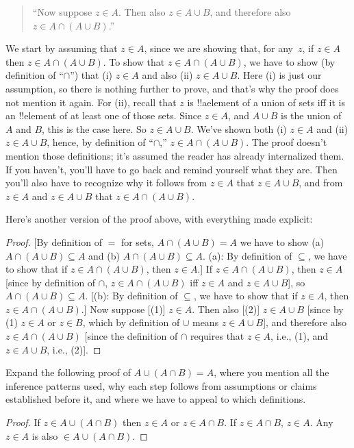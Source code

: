 \documentclass[../../../include/open-logic-section]{subfiles}
\begin{document}
\begin{quote}
``Now suppose $z \in A$. Then also $z \in A \cup B$, and
therefore also $z \in A \cap (A \cup B)$.''
\end{quote}

We start by assuming that $z \in A$, since we are showing that, for
any~$z$, if $z \in A$ then $z \in A \cap (A \cup B)$.  To show that $z
\in A \cap (A \cup B)$, we have to show (by definition of ``$\cap$'')
that (i) $z \in A$ and also (ii) $z \in A \cup B$. Here (i) is just
our assumption, so there is nothing further to prove, and that's why
the proof does not mention it again. For (ii), recall that $z$ is
!!a{element} of a union of sets iff it is an !!{element} of at least
one of those sets. Since $z \in A$, and $A \cup B$ is the union of $A$
and $B$, this is the case here. So $z \in A \cup B$. We've shown both
(i) $z \in A$ and (ii) $z \in A \cup B$, hence, by definition of
``$\cap$,'' $z \in A \cap (A \cup B)$.  The proof doesn't mention
those definitions; it's assumed the reader has already internalized
them.  If you haven't, you'll have to go back and remind yourself what
they are. Then you'll also have to recognize why it follows from $z
\in A$ that $z \in A \cup B$, and from $z \in A$ and $z \in A \cup B$
that $z \in A \cap (A \cup B)$.

Here's another version of the proof above, with everything made
explicit:
\begin{proof}{}
[By definition of $=$ for sets, $A \cap (A \cup B) = A$ we have to
  show (a) $A \cap (A \cup B) \subseteq A$ and (b) $A \cap (A \cup B)
  \subseteq A$. (a): By definition of $\subseteq$, we have to show
  that if $z \in A \cap (A \cup B)$, then $z \in A$.]  If $z \in A
\cap (A \cup B)$, then $z \in A$ [since by definition of $\cap$, $z
  \in A \cap (A \cup B)$ iff $z \in A$ and $z \in A \cup B$], so $A
\cap (A \cup B) \subseteq A$. [(b): By definition of $\subseteq$, we
  have to show that if $z \in A$, then $z \in A \cap (A \cup B)$.] Now
suppose [(1)] $z \in A$. Then also [(2)] $z \in A \cup B$ [since by
  (1) $z \in A$ or $z \in B$, which by definition of $\cup$ means $z
  \in A \cup B$], and therefore also $z \in A \cap (A \cup B)$ [since
  the definition of $\cap$ requires that $z \in A$, i.e., (1), and $z
  \in A \cup B$, i.e., (2)].
\end{proof}

\begin{prob}
Expand the following proof of $A \cup (A \cap B) = A$, where you
mention all the inference patterns used, why each step follows from
assumptions or claims established before it, and where we have to
appeal to which definitions.
\begin{proof}
  If $z \in A \cup (A \cap B)$ then $z \in A$ or $z \in A \cap B$. If
  $z \in A \cap B$, $z \in A$. Any $z \in A$ is also $\in A \cup (A
  \cap B)$.
\end{proof}
\end{prob}
\end{document}
